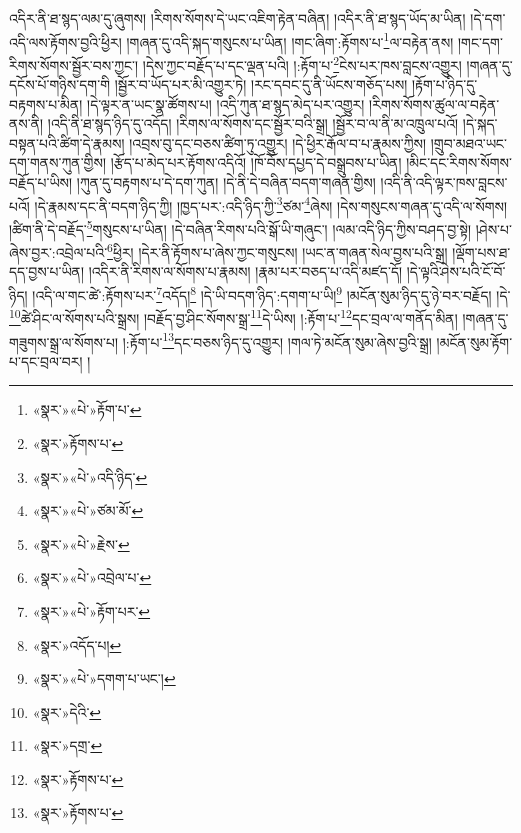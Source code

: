 འདིར་ནི་ཐ་སྙད་ལམ་དུ་ཞུགས། །རིགས་སོགས་དེ་ཡང་འཇིག་རྟེན་བཞིན། །འདིར་ནི་ཐ་སྙད་ཡོད་མ་ཡིན། །དེ་དག་འདི་ལས་རྟོགས་བྱའི་ཕྱིར། །གཞན་དུ་འདི་སྐད་གསུངས་པ་ཡིན། །གང་ཞིག་:རྟོགས་པ་\footnote{«སྣར་»«པེ་»རྟོག་པ་}ལ་བརྟེན་ནས། །གང་དག་རིགས་སོགས་སྦྱོར་བས་ཀྱང་། །དེས་ཀྱང་བརྗོད་པ་དང་ལྡན་པའི། །:རྟོག་པ་\footnote{«སྣར་»རྟོགས་པ་}ངེས་པར་ཁས་བླངས་འགྱུར། །གཞན་དུ་དངོས་པོ་གཉིས་དག་གི །སྦྱོར་བ་ཡོད་པར་མི་འགྱུར་ཏེ། །རང་དབང་དུ་ནི་ཡོངས་གཅོད་པས། །རྟོག་པ་ཉིད་དུ་བརྟགས་པ་མིན། །དེ་ལྟར་ན་ཡང་སྣ་ཚོགས་པ། །འདི་ཀུན་ཐ་སྙད་མེད་པར་འགྱུར། །རིགས་སོགས་ཚུལ་ལ་བརྟེན་ནས་ནི། །འདི་ནི་ཐ་སྙད་ཉིད་དུ་འདོད། །རིགས་ལ་སོགས་དང་སྦྱོར་བའི་སྒྲ། །སྦྱོར་བ་ལ་ནི་མ་འཁྲུལ་པའོ། །དེ་སྐད་བསྟན་པའི་ཚིག་དེ་རྣམས། །འབྲས་བུ་དང་བཅས་ཚིག་ཏུ་འགྱུར། །དེ་ཕྱིར་རྒོལ་བ་པ་རྣམས་ཀྱིས། །གྲུབ་མཐའ་ཡང་དག་གནས་ཀུན་གྱིས། །རྩོད་པ་མེད་པར་རྟོགས་འདིའོ། །ཁོ་བོས་དཔྱད་དེ་བསྒྲུབས་པ་ཡིན། །མིང་དང་རིགས་སོགས་བརྗོད་པ་ཡིས། །ཀུན་དུ་བརྟགས་པ་དེ་དག་ཀུན། །དེ་ནི་དེ་བཞིན་བདག་གཞན་གྱིས། །འདི་ནི་འདི་ལྟར་ཁས་བླངས་པའོ། །དེ་རྣམས་དང་ནི་བདག་ཉིད་ཀྱི། །ཁྱད་པར་:འདི་ཉིད་ཀྱི་\footnote{«སྣར་»«པེ་»འདི་ཉིད་}ཙམ་\footnote{«སྣར་»«པེ་»ཙམ་མོ་}ཞེས། །དེས་གསུངས་གཞན་དུ་འདི་ལ་སོགས། །ཚིག་ནི་དེ་བརྗོད་\footnote{«སྣར་»«པེ་»རྗེས་}གསུངས་པ་ཡིན། །དེ་བཞིན་རིགས་པའི་སྒོ་ཡི་གཞུང་། །ལམ་འདི་ཉིད་ཀྱིས་བཤད་བྱ་སྟེ། །ཤེས་པ་ཞེས་བྱར་:འབྲེལ་པའི་\footnote{«སྣར་»«པེ་»འབྲེལ་པ་}ཕྱིར། །དེར་ནི་རྟོགས་པ་ཞེས་ཀྱང་གསུངས། །ཡང་ན་གཞན་སེལ་བྱས་པའི་སྒྲ། །ལྡོག་པས་ཐ་དད་བྱས་པ་ཡིན། །འདིར་ནི་རིགས་ལ་སོགས་པ་རྣམས། །རྣམ་པར་བཅད་པ་འདི་མཛད་དོ། །དེ་ལྟའི་ཤེས་པའི་ངོ་བོ་ཉིད། །འདི་ལ་གང་ཚེ་:རྟོགས་པར་\footnote{«སྣར་»«པེ་»རྟོག་པར་}འདོད།\footnote{«སྣར་»འདོད་པ།} །དེ་ཡི་བདག་ཉིད་:དགག་པ་ཡི།\footnote{«སྣར་»«པེ་»དགག་པ་ཡང་།} །མངོན་སུམ་ཉིད་དུ་ཉེ་བར་བརྗོད། །དེ་\footnote{«སྣར་»དེའི་}ཚེ་ཤིང་ལ་སོགས་པའི་སྒྲས། །བརྗོད་བྱ་ཤིང་སོགས་སྒྲ་\footnote{«སྣར་»དགྲ་}དེ་ཡིས། །:རྟོག་པ་\footnote{«སྣར་»རྟོགས་པ་}དང་བྲལ་ལ་གནོད་མིན། །གཞན་དུ་གཟུགས་སྒྲ་ལ་སོགས་པ། །:རྟོག་པ་\footnote{«སྣར་»རྟོགས་པ་}དང་བཅས་ཉིད་དུ་འགྱུར། །གལ་ཏེ་མངོན་སུམ་ཞེས་བྱའི་སྒྲ། །མངོན་སུམ་རྟོག་པ་དང་བྲལ་བར། །
